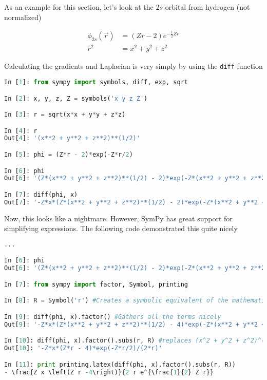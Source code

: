 As an example for this section, let's look at the $2s$ orbital from hydrogen (not normalized)

\begin{align}
 \phi_{2s}(\vec r) &= (Zr - 2)e^{-\frac{1}{2}Zr} \\
 r^2 &= x^2 + y^2 + z^2
\end{align}

Calculating the gradients and Laplacian is very simply by using the \verb+diff+ function

\begin{lstlisting}[language=Python]
In [1]: from sympy import symbols, diff, exp, sqrt

In [2]: x, y, z, Z = symbols('x y z Z')

In [3]: r = sqrt(x*x + y*y + z*z)

In [4]: r
Out[4]: '(x**2 + y**2 + z**2)**(1/2)'

In [5]: phi = (Z*r - 2)*exp(-Z*r/2)

In [6]: phi
Out[6]: '(Z*(x**2 + y**2 + z**2)**(1/2) - 2)*exp(-Z*(x**2 + y**2 + z**2)**(1/2)/2)'

In [7]: diff(phi, x)
Out[7]: '-Z*x*(Z*(x**2 + y**2 + z**2)**(1/2) - 2)*exp(-Z*(x**2 + y**2 + z**2)**(1/2)/2)/(2*(x**2 + y**2 + z**2)**(1/2)) + Z*x*exp(-Z*(x**2 + y**2 + z**2)**(1/2)/2)/(x**2 + y**2 + z**2)**(1/2)'

\end{lstlisting}

Now, this looks like a nightmare. However, SymPy has great support for simplifying expressions. The following code demonstrated this quite nicely

\begin{lstlisting}[language=Python]
...

In [6]: phi
Out[6]: '(Z*(x**2 + y**2 + z**2)**(1/2) - 2)*exp(-Z*(x**2 + y**2 + z**2)**(1/2)/2)'

In [7]: from sympy import factor, Symbol, printing

In [8]: R = Symbol('r') #Creates a symbolic equivalent of the mathematical r

In [9]: diff(phi, x).factor() #Gathers all the terms nicely
Out[9]: '-Z*x*(Z*(x**2 + y**2 + z**2)**(1/2) - 4)*exp(-Z*(x**2 + y**2 + z**2)**(1/2)/2)/(2*(x**2 + y**2 + z**2)**(1/2))'

In [10]: diff(phi, x).factor().subs(r, R) #replaces (x^2 + y^2 + z^2)^(1/2) with r
Out[10]: '-Z*x*(Z*r - 4)*exp(-Z*r/2)/(2*r)'

In [11]: print printing.latex(diff(phi, x).factor().subs(r, R))
- \frac{Z x \left(Z r -4\right)}{2 r e^{\frac{1}{2} Z r}}

\end{lstlisting}


